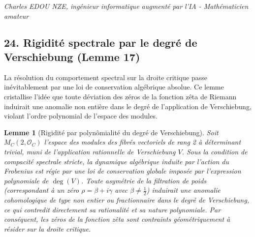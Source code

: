 \documentclass[
]{article}
\newtheorem{lemma}{Lemme}
\begin{document}
\vspace{1cm}
\begin{flushright}
\textit{Charles EDOU NZE, ingénieur informatique augmenté par l'IA - Mathématicien amateur}
\end{flushright}



\subsection{24. Rigidité spectrale par le degré de Verschiebung (Lemme 17)}
La résolution du comportement spectral sur la droite critique passe inévitablement par une loi de conservation algébrique absolue. Ce lemme cristallise l'idée que toute déviation des zéros de la fonction zêta de Riemann induirait une anomalie non entière dans le degré de l'application de Verschiebung, violant l'ordre polynomial de l'espace des modules.

\begin{lemma}[Rigidité par polynômialité du degré de Verschiebung]
Soit $M_C(2, \mathcal{O}_C)$ l'espace des modules des fibrés vectoriels de rang 2 à déterminant trivial, muni de l'application rationnelle de Verschiebung $V$. Sous la condition de compacité spectrale stricte, la dynamique algébrique induite par l'action du Frobenius est régie par une loi de conservation globale imposée par l'expression polynomiale de $\deg(V)$. Toute asymétrie de la filtration de poids (correspondant à un zéro $\rho = \beta + i\gamma$ avec $\beta \neq \frac{1}{2}$) induirait une anomalie cohomologique de type non entier ou fractionnaire dans le degré de Verschiebung, ce qui contredit directement sa rationalité et sa nature polynomiale. Par conséquent, les zéros de la fonction zêta sont contraints géométriquement à résider sur la droite critique.
\end{lemma}
\end{document}

